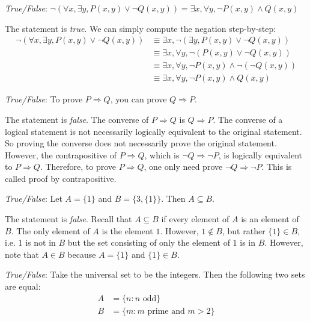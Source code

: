 \documentclass[11pt,letterpaper]{article}
\begin{document}
\quizsol \textit{True/False}: $\neg \left( \forall x, \exists y, P(x,y) \vee \neg Q(x,y) \right)= \exists x, \forall y, \neg P(x,y) \wedge Q(x,y)$ \pspace

\sol The statement is \textit{true}. We can simply compute the negation step-by-step:
	\[
	\begin{aligned}
	\neg \left( \forall x, \exists y, P(x,y) \vee \neg Q(x,y) \right)&\equiv \exists x, \neg( \exists y, P(x,y) \vee \neg Q(x,y) ) \\
	&\equiv \exists x, \forall y, \neg ( P(x,y) \vee \neg Q(x,y) ) \\
	&\equiv \exists x, \forall y, \neg P(x,y) \wedge \neg (\neg Q(x,y)) \\
	&\equiv \exists x, \forall y, \neg P(x,y) \wedge Q(x,y)
	\end{aligned}
	\]



\quizsol \textit{True/False}: To prove $P \Rightarrow Q$, you can prove $Q \Rightarrow P$. \pspace

\sol The statement is \textit{false}. The converse of $P \Rightarrow Q$ is $Q \Rightarrow P$. The converse of a logical statement is not necessarily logically equivalent to the original statement. So proving the converse does not necessarily prove the original statement. However, the contrapositive of $P \Rightarrow Q$, which is $\neg Q \Rightarrow \neg P$, is logically equivalent to $P \Rightarrow Q$. Therefore, to prove $P \Rightarrow Q$, one only need prove $\neg Q \Rightarrow \neg P$. This is called proof by contrapositive. \pvspace{1.5cm}



\quizsol \textit{True/False}: Let $A= \{ 1 \}$ and $B= \{ 3, \{ 1 \} \}$. Then $A \subseteq B$. \pspace

\sol The statement is \textit{false}. Recall that $A \subseteq B$ if every element of $A$ is an element of $B$. The only element of $A$ is the element $1$. However, $1 \notin B$, but rather $\{ 1 \} \in B$, i.e. $1$ is not in $B$ but the set consisting of only the element of $1$ is in $B$. However, note that $A \in B$ because $A= \{ 1 \}$ and $\{ 1 \} \in B$. \pvspace{1.5cm}



\quizsol \textit{True/False}: Take the universal set to be the integers. Then the following two sets are equal:
	\[
	\begin{aligned}
	A&= \{ n \colon n \text{ odd} \} \\
	B&= \{ m \colon m \text{ prime and } m > 2 \}
	\end{aligned}
	\]
\end{document}
